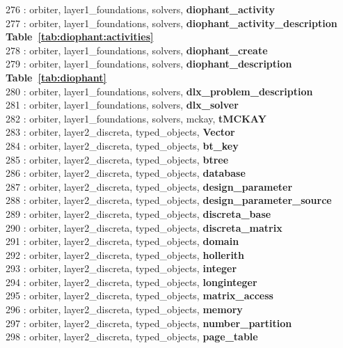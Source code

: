 276 : orbiter, layer1\_foundations, solvers, {\bf diophant\_activity}\\
277 : orbiter, layer1\_foundations, solvers, {\bf diophant\_activity\_description Table~\ref{tab:diophant:activities}}\\
278 : orbiter, layer1\_foundations, solvers, {\bf diophant\_create}\\
279 : orbiter, layer1\_foundations, solvers, {\bf diophant\_description Table~\ref{tab:diophant}}\\
280 : orbiter, layer1\_foundations, solvers, {\bf dlx\_problem\_description}\\
281 : orbiter, layer1\_foundations, solvers, {\bf dlx\_solver}\\
282 : orbiter, layer1\_foundations, solvers, mckay, {\bf tMCKAY}\\
283 : orbiter, layer2\_discreta, typed\_objects, {\bf Vector}\\
284 : orbiter, layer2\_discreta, typed\_objects, {\bf bt\_key}\\
285 : orbiter, layer2\_discreta, typed\_objects, {\bf btree}\\
286 : orbiter, layer2\_discreta, typed\_objects, {\bf database}\\
287 : orbiter, layer2\_discreta, typed\_objects, {\bf design\_parameter}\\
288 : orbiter, layer2\_discreta, typed\_objects, {\bf design\_parameter\_source}\\
289 : orbiter, layer2\_discreta, typed\_objects, {\bf discreta\_base}\\
290 : orbiter, layer2\_discreta, typed\_objects, {\bf discreta\_matrix}\\
291 : orbiter, layer2\_discreta, typed\_objects, {\bf domain}\\
292 : orbiter, layer2\_discreta, typed\_objects, {\bf hollerith}\\
293 : orbiter, layer2\_discreta, typed\_objects, {\bf integer}\\
294 : orbiter, layer2\_discreta, typed\_objects, {\bf longinteger}\\
295 : orbiter, layer2\_discreta, typed\_objects, {\bf matrix\_access}\\
296 : orbiter, layer2\_discreta, typed\_objects, {\bf memory}\\
297 : orbiter, layer2\_discreta, typed\_objects, {\bf number\_partition}\\
298 : orbiter, layer2\_discreta, typed\_objects, {\bf page\_table}\\
